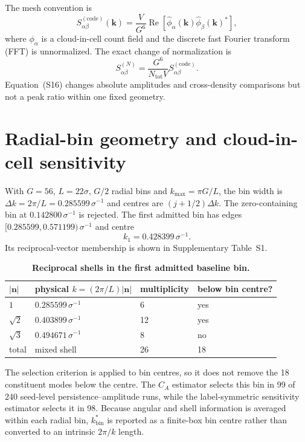 \documentclass[pdflatex,sn-nature,onecolumn]{sn-jnl}
\begin{document}
The mesh convention is
\begin{equation}
S_{\alpha\beta}^{(\mathrm{code})}(\bm{k})=
\frac{V}{G^6}\operatorname{Re}[\widehat\phi_\alpha(\bm{k})
\widehat\phi_\beta(\bm{k})^*],
\tag{S15}
\end{equation}
where $\phi_\alpha$ is a cloud-in-cell count field and the discrete fast Fourier transform (FFT) is unnormalized. The exact change of normalization is
\begin{equation}
S_{\alpha\beta}^{(N)}=\frac{G^6}{N_{\mathrm{tot}}V}
S_{\alpha\beta}^{(\mathrm{code})}.
\tag{S16}
\end{equation}
Equation~(S16) changes absolute amplitudes and cross-density comparisons but not a peak ratio within one fixed geometry.

\section*{Radial-bin geometry and cloud-in-cell sensitivity}

With $G=56$, $L=22\sigma$, $G/2$ radial bins and $k_{\max}=\pi G/L$, the bin width is $\Delta k=2\pi/L=0.285599\,\sigma^{-1}$ and centres are $(j+1/2)\Delta k$. The zero-containing bin at $0.142800\,\sigma^{-1}$ is rejected. The first admitted bin has edges $[0.285599,0.571199)\,\sigma^{-1}$ and centre
\begin{equation}
k_1=0.428399\,\sigma^{-1}.
\tag{S17}
\end{equation}
Its reciprocal-vector membership is shown in Supplementary Table~S1.

\begin{table}[!htbp]
\centering
\caption{\textbf{Reciprocal shells in the first admitted baseline bin.}}
\label{tab:first-admitted-shells}
\begin{tabular}{llll}
\toprule
$|\bm n|$ & physical $k=(2\pi/L)|\bm n|$ & multiplicity & below bin centre?\\
\midrule
$1$ & $0.285599\,\sigma^{-1}$ & 6 & yes\\
$\sqrt2$ & $0.403899\,\sigma^{-1}$ & 12 & yes\\
$\sqrt3$ & $0.494671\,\sigma^{-1}$ & 8 & no\\
\midrule
total & mixed shell & 26 & 18\\
\bottomrule
\end{tabular}
\end{table}

The selection criterion is applied to bin centres, so it does not remove the 18 constituent modes below the centre. The $C_A$ estimator selects this bin in 99 of 240 seed-level persistence--amplitude runs, while the label-symmetric sensitivity estimator selects it in 98. Because angular and shell information is averaged within each radial bin, $k_{\mathrm{bin}}^*$ is reported as a finite-box bin centre rather than converted to an intrinsic $2\pi/k$ length.
\end{document}

